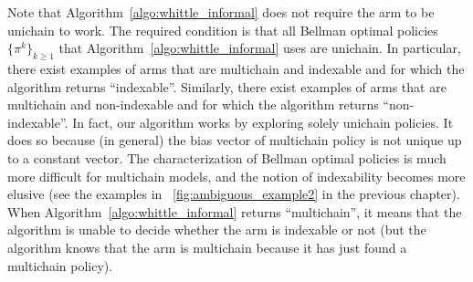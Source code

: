 Note that Algorithm~\ref{algo:whittle_informal} does not require the arm to be unichain to work.
The required condition is that all Bellman optimal policies $\{\pi^k\}_{k\ge1}$ that Algorithm~\ref{algo:whittle_informal} uses are unichain.
In particular, there exist examples of arms that are multichain and indexable and for which the algorithm returns ``indexable''.
Similarly, there exist examples of arms that are multichain and non-indexable and for which the algorithm returns ``non-indexable''.
In fact, our algorithm works by exploring solely unichain policies. It does so because (in general) the bias vector of multichain policy is not unique up to a constant vector.
The characterization of Bellman optimal policies is much more difficult for multichain models, and the notion of indexability becomes more elusive (see the examples in \figurename~\ref{fig:ambiguous_example2} in the previous chapter).
When Algorithm~\ref{algo:whittle_informal} returns ``multichain'', it means that the algorithm is unable to decide whether the arm is indexable or not (but the algorithm knows that the arm is multichain because it has just found a multichain policy).

